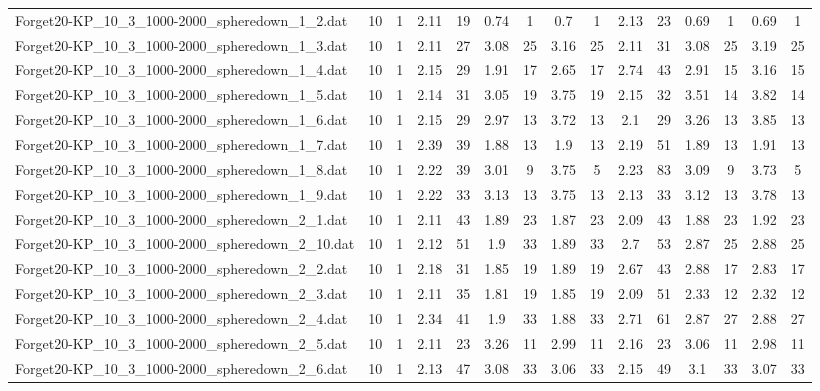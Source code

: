 \begin{table}[!ht]
{\begin{tabular}{lcccccccccccccc}
Forget20-KP\_10\_3\_1000-2000\_spheredown\_1\_2.dat & 10 & 1 & 2.11 & 19 & 0.74 & 1 & 0.7 & 1 & 2.13 & 23 & 0.69 & 1 & 0.69 & 1 \\
Forget20-KP\_10\_3\_1000-2000\_spheredown\_1\_3.dat & 10 & 1 & 2.11 & 27 & 3.08 & 25 & 3.16 & 25 & 2.11 & 31 & 3.08 & 25 & 3.19 & 25 \\
Forget20-KP\_10\_3\_1000-2000\_spheredown\_1\_4.dat & 10 & 1 & 2.15 & 29 & 1.91 & 17 & 2.65 & 17 & 2.74 & 43 & 2.91 & 15 & 3.16 & 15 \\
Forget20-KP\_10\_3\_1000-2000\_spheredown\_1\_5.dat & 10 & 1 & 2.14 & 31 & 3.05 & 19 & 3.75 & 19 & 2.15 & 32 & 3.51 & 14 & 3.82 & 14 \\
Forget20-KP\_10\_3\_1000-2000\_spheredown\_1\_6.dat & 10 & 1 & 2.15 & 29 & 2.97 & 13 & 3.72 & 13 & 2.1 & 29 & 3.26 & 13 & 3.85 & 13 \\
Forget20-KP\_10\_3\_1000-2000\_spheredown\_1\_7.dat & 10 & 1 & 2.39 & 39 & 1.88 & 13 & 1.9 & 13 & 2.19 & 51 & 1.89 & 13 & 1.91 & 13 \\
Forget20-KP\_10\_3\_1000-2000\_spheredown\_1\_8.dat & 10 & 1 & 2.22 & 39 & 3.01 & 9 & 3.75 & 5 & 2.23 & 83 & 3.09 & 9 & 3.73 & 5 \\
Forget20-KP\_10\_3\_1000-2000\_spheredown\_1\_9.dat & 10 & 1 & 2.22 & 33 & 3.13 & 13 & 3.75 & 13 & 2.13 & 33 & 3.12 & 13 & 3.78 & 13 \\
Forget20-KP\_10\_3\_1000-2000\_spheredown\_2\_1.dat & 10 & 1 & 2.11 & 43 & 1.89 & 23 & 1.87 & 23 & 2.09 & 43 & 1.88 & 23 & 1.92 & 23 \\
Forget20-KP\_10\_3\_1000-2000\_spheredown\_2\_10.dat & 10 & 1 & 2.12 & 51 & 1.9 & 33 & 1.89 & 33 & 2.7 & 53 & 2.87 & 25 & 2.88 & 25 \\
Forget20-KP\_10\_3\_1000-2000\_spheredown\_2\_2.dat & 10 & 1 & 2.18 & 31 & 1.85 & 19 & 1.89 & 19 & 2.67 & 43 & 2.88 & 17 & 2.83 & 17 \\
Forget20-KP\_10\_3\_1000-2000\_spheredown\_2\_3.dat & 10 & 1 & 2.11 & 35 & 1.81 & 19 & 1.85 & 19 & 2.09 & 51 & 2.33 & 12 & 2.32 & 12 \\
Forget20-KP\_10\_3\_1000-2000\_spheredown\_2\_4.dat & 10 & 1 & 2.34 & 41 & 1.9 & 33 & 1.88 & 33 & 2.71 & 61 & 2.87 & 27 & 2.88 & 27 \\
Forget20-KP\_10\_3\_1000-2000\_spheredown\_2\_5.dat & 10 & 1 & 2.11 & 23 & 3.26 & 11 & 2.99 & 11 & 2.16 & 23 & 3.06 & 11 & 2.98 & 11 \\
Forget20-KP\_10\_3\_1000-2000\_spheredown\_2\_6.dat & 10 & 1 & 2.13 & 47 & 3.08 & 33 & 3.06 & 33 & 2.15 & 49 & 3.1 & 33 & 3.07 & 33 \\

\end{tabular}}
\end{table}
